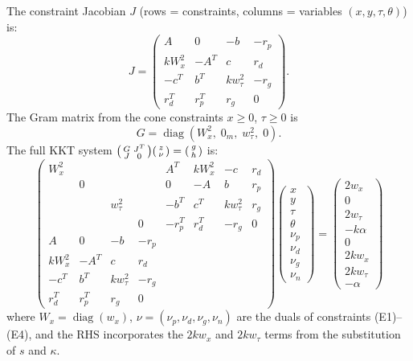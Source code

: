 \documentclass{article}
\newcommand{\diag}{\operatorname{diag}}
\begin{document}
The constraint Jacobian $J$ (rows = constraints, columns = variables $(x, y, \tau, \theta)$) is:
\[
  J = \begin{pmatrix}
    A & 0 & -b & -r_p \\
    kW_x^2 & -A^T & c & r_d \\
    -c^T & b^T & kw_\tau^2 & -r_g \\
    r_d^T & r_p^T & r_g & 0
  \end{pmatrix}.
\]
The Gram matrix from the cone constraints $x \geq 0$, $\tau \geq 0$ is
\[
  G = \diag(W_x^2,\; 0_m,\; w_\tau^2,\; 0).
\]
The full KKT system $\begin{psmallmatrix} G & J^T \\ J & 0 \end{psmallmatrix} \begin{psmallmatrix} z \\ \nu \end{psmallmatrix} = \begin{psmallmatrix} g \\ h \end{psmallmatrix}$ is:
\begin{equation} \label{eq:reduced_kkt}
  \begin{pmatrix}
    W_x^2 & & & & A^T & k W_x^2 & -c & r_d \\
    & 0 & & & 0 & -A & b & r_p \\
    & & w_\tau^2 & & -b^T & c^T & k w_\tau^2 & r_g \\
    & & & 0 & -r_p^T & r_d^T & -r_g & 0 \\
    A & 0 & -b & -r_p & & & & \\
    kW_x^2 & -A^T & c & r_d & & & & \\
    -c^T & b^T & kw_\tau^2 & -r_g & & & & \\
    r_d^T & r_p^T & r_g & 0 & & & &
  \end{pmatrix}
  \begin{pmatrix} x \\ y \\ \tau \\ \theta \\ \nu_p \\ \nu_d \\ \nu_g \\ \nu_n \end{pmatrix}
  =
  \begin{pmatrix}
    2w_x \\ 0 \\ 2w_\tau \\ -k\alpha \\
    0 \\ 2kw_x \\ 2kw_\tau \\ -\alpha
  \end{pmatrix}
\end{equation}
where $W_x = \diag(w_x)$, $\nu = (\nu_p, \nu_d, \nu_g, \nu_n)$ are the duals of constraints (E1)--(E4), and the RHS incorporates the $2kw_x$ and $2kw_\tau$ terms from the substitution of $s$ and $\kappa$.
\end{document}
